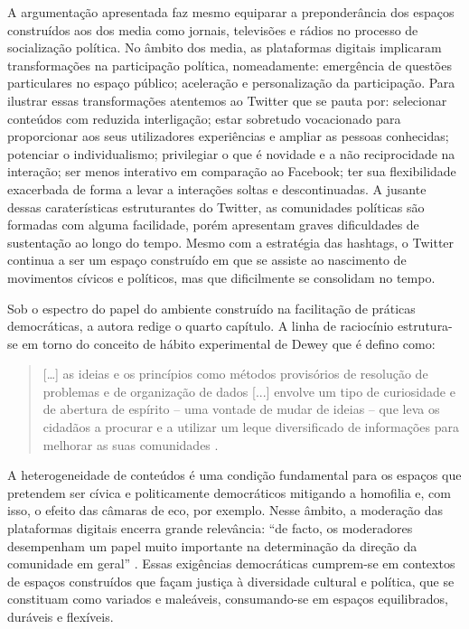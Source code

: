 \documentclass[portuguese]{textolivre}
\begin{document}
A argumentação apresentada faz mesmo equiparar a preponderância dos espaços construídos aos dos media como jornais, televisões e rádios no processo de socialização política. No âmbito dos media, as plataformas digitais implicaram transformações na participação política, nomeadamente: emergência de questões particulares no espaço público; aceleração e personalização da participação. Para ilustrar essas transformações atentemos ao Twitter que se pauta por: selecionar conteúdos com reduzida interligação; estar sobretudo vocacionado para proporcionar aos seus utilizadores experiências e ampliar as pessoas conhecidas; potenciar o individualismo; privilegiar o que é novidade e a não reciprocidade na interação; ser menos interativo em comparação ao Facebook; ter sua flexibilidade exacerbada de forma a levar a interações soltas e descontinuadas. A jusante dessas caraterísticas estruturantes do Twitter, as comunidades políticas são formadas com alguma facilidade, porém apresentam graves dificuldades de sustentação ao longo do tempo. Mesmo com a estratégia das hashtags, o Twitter continua a ser um espaço construído em que se assiste ao nascimento de movimentos cívicos e políticos, mas que dificilmente se consolidam no tempo.

Sob o espectro do papel do ambiente construído na facilitação de práticas democráticas, a autora redige o quarto capítulo. A linha de raciocínio estrutura-se em torno do conceito de hábito experimental de Dewey que é defino como:

\begin{quote}
    […] as ideias e os princípios como métodos provisórios de resolução de problemas e de organização de dados [...] envolve um tipo de curiosidade e de abertura de espírito – uma vontade de mudar de ideias – que leva os cidadãos a procurar e a utilizar um leque diversificado de informações para melhorar as suas comunidades \cite[p. 105, tradução nossa]{forestal_designing_2021}.
\end{quote}

A heterogeneidade de conteúdos é uma condição fundamental para os espaços que pretendem ser cívica e politicamente democráticos mitigando a homofilia e, com isso, o efeito das câmaras de eco, por exemplo. Nesse âmbito, a moderação das plataformas digitais encerra grande relevância: “de facto, os moderadores desempenham um papel muito importante na determinação da direção da comunidade em geral” \cite[p. 132, tradução nossa]{forestal_designing_2021}. Essas exigências democráticas cumprem-se em contextos de espaços construídos que façam justiça à diversidade cultural e política, que se constituam como variados e maleáveis, consumando-se em espaços equilibrados, duráveis e flexíveis. 
\end{document}
